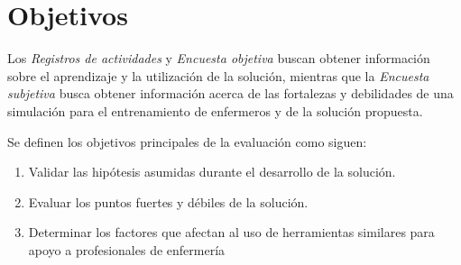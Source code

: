 \section{Objetivos}
\label{sec:objetivos}

Los \emph{Registros de actividades} y \emph{Encuesta objetiva} buscan obtener 
información sobre el aprendizaje y la utilización de la solución, mientras que 
la \emph{Encuesta subjetiva} busca obtener información acerca de las fortalezas y 
debilidades de una simulación para el entrenamiento de enfermeros y de la solución 
propuesta.

Se definen los objetivos principales de la evaluación como siguen:

\begin{enumerate}

\item Validar las hipótesis asumidas durante el desarrollo de la
    solución.

\item Evaluar los puntos fuertes y débiles de la solución.

\item Determinar los factores que afectan al uso de herramientas similares para
    apoyo a profesionales de enfermería
    

\end{enumerate}
